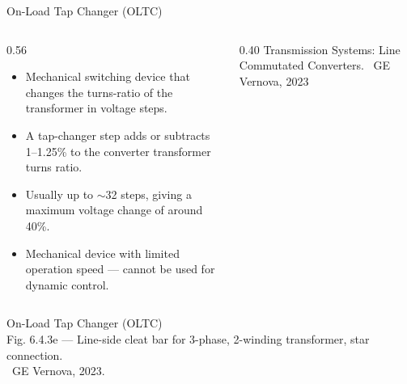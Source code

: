 \begin{frame}{On-Load Tap Changer (OLTC)}
  \begin{columns}[c,onlytextwidth]
    \begin{column}{0.56\textwidth}
      \begin{itemize}
        \setlength{\itemsep}{0.45em}
        \item Mechanical switching device that changes the turns-ratio of
              the transformer in voltage steps.
        \item A tap-changer step adds or subtracts 1--1.25\% to the
              converter transformer turns ratio.
        \item Usually up to $\sim$32 steps, giving a maximum voltage change
              of around 40\%.
        \item Mechanical device with limited operation speed --- cannot be
              used for dynamic control.
      \end{itemize}
      \vspace{0.3em}

    \end{column}
    \begin{column}{0.40\textwidth}
      \centering
      {\color{atGray}\footnotesize Transmission Systems: Line Commutated
      Converters. \textcopyright\ GE Vernova, 2023}      
    \end{column}
  \end{columns}
\end{frame}

\begin{frame}{On-Load Tap Changer (OLTC)}
  \centering
  \\[0.4em]
  {\color{atGray}\footnotesize Fig. 6.4.3e --- Line-side cleat bar for 3-phase, 2-winding transformer, star connection.\\ \textcopyright\ GE Vernova, 2023.}
\end{frame}

